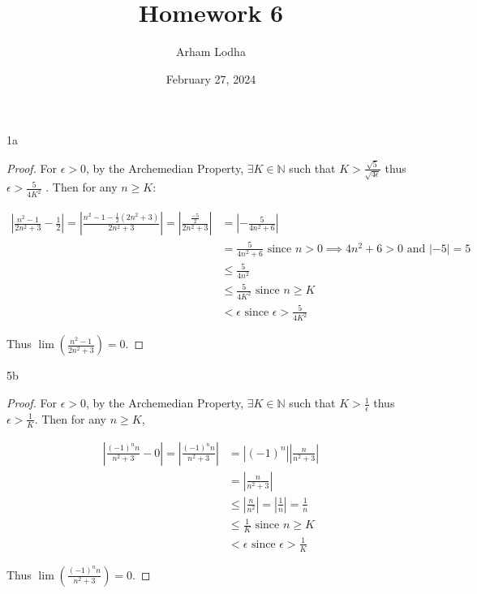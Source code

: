 \documentclass{article}
\newcommand{\N}{\mathbb{N}}
\newcommand{\abs}[1]{\left\vert #1\right \vert}
\begin{document}
\title{Homework 6}
\author{Arham Lodha}%
\date{February 27, 2024}%
\maketitle

\begin{PROB}{1a}\label{Problem 1a.}
\end{PROB}
\begin{proof}
    For $\epsilon > 0$, by the Archemedian Property, $\exists K \in \N$ such that $K > \frac{\sqrt{5}}{\sqrt{4\epsilon}}$ thus $\epsilon > \frac{5}{4K^2}$ . Then for any $n \geq K$:
    
    \begin{align*}
        \abs{\frac{n^2 - 1}{2n^2 + 3} - \frac{1}{2}} = \abs{\frac{n^2 - 1 - \frac{1}{2}(2n^2 + 3)}{2n^2 + 3}} = \abs{\frac{\frac{-5}{2}}{2n^2 + 3}} &= \abs{-\frac{5}{4n^2 + 6}} \\
        &= \frac{5}{4n^2 + 6} \text{ since $n > 0 \implies 4n^2 + 6 > 0$ and $|-5| = 5$} \\
        &\leq \frac{5}{4n^2} \\
        &\leq \frac{5}{4K^2} \text{ since $n \geq K$ } \\
        &< \epsilon \text{ since $\epsilon > \frac{5}{4K^2}$ } 
    \end{align*}

    Thus $\lim \left(\frac{n^2 - 1}{2n^2 + 3}\right) = 0$.  

\end{proof}

\begin{PROB}{5b}\label{Problem 5b.}
\end{PROB}
\begin{proof}
    For $\epsilon > 0$, by the Archemedian Property, $\exists K \in \N$ such that $K > \frac{1}{\epsilon}$ thus $\epsilon > \frac{1}{K}$. Then for any $n \geq K$, 
    
    \begin{align*}
        \abs{\frac{(-1)^n n}{n^2 + 3} - 0} = \abs{\frac{(-1)^n n}{n^2 + 3}} &= \abs{(-1)^n} \abs{\frac{n}{n^2 + 3}} \\
        &= \abs{\frac{n}{n^2 + 3}} \\
        &\leq \abs{\frac{n}{n^2}} = \abs{\frac{1}{n}} = \frac{1}{n} \\
        &\leq \frac{1}{K} \text{ since $n \geq K$} \\
        &< \epsilon \text{ since $\epsilon > \frac{1}{K}$ }
    \end{align*}

    Thus $\lim \left(\frac{(-1)^n n}{n^2 + 3}\right) = 0$.  

\end{proof}
\end{document}
